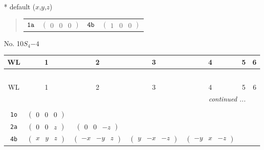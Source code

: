 \documentclass[fleqn,9pt,landscape]{jsarticle}
\begin{document}
* default ($x$,$y$,$z$)
\begin{quote}
\begin{tabular}{cccc}
$ {\tt 1a} $ & $ \begin{pmatrix} 0 & 0 & 0 \end{pmatrix} $ & $ {\tt 4b} $ & $ \begin{pmatrix} 1 & 0 & 0 \end{pmatrix} $
\end{tabular}
\end{quote}
\newpage
No. 10\quad$S_{4}$\quad$-4$\quad[ tetragonal ]
\begin{center}
\renewcommand{\arraystretch}{1.2}
\begin{longtable}{ccccccc}
 \hline \hline
WL & 1 & 2 & 3 & 4 & 5 & 6 \\ \hline \endfirsthead

\multicolumn{6}{l}{\tablename\ \thetable{}} \\
 \hline \hline
WL & 1 & 2 & 3 & 4 & 5 & 6 \\ \hline \endhead

 \hline \hline
\multicolumn{6}{r}{\footnotesize\it continued ...} \\ \endfoot

 \hline \hline
\multicolumn{6}{r}{} \\ \endlastfoot

{\tt 1o} & $ \begin{pmatrix} 0 & 0 & 0 \end{pmatrix} $ & $  $ & $  $ & $  $ \\ \hline
{\tt 2a} & $ \begin{pmatrix} 0 & 0 & z \end{pmatrix} $ & $ \begin{pmatrix} 0 & 0 & - z \end{pmatrix} $ & $  $ & $  $ \\ \hline
{\tt 4b} & $ \begin{pmatrix} x & y & z \end{pmatrix} $ & $ \begin{pmatrix} - x & - y & z \end{pmatrix} $ & $ \begin{pmatrix} y & - x & - z \end{pmatrix} $ & $ \begin{pmatrix} - y & x & - z \end{pmatrix} $ \\
\end{longtable}
\end{center}
\end{document}
